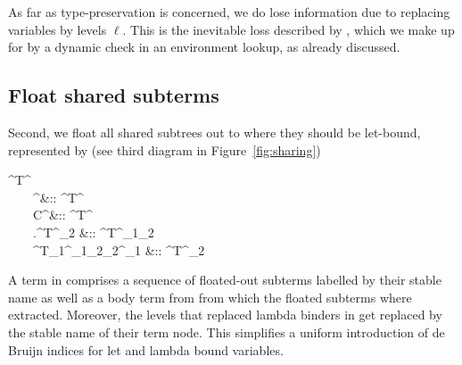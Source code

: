 As far as type-preservation is concerned, we do lose information due to replacing variables by levels $\ell$. This is the inevitable loss described by \citet{Atkey:Unembedding}, which we make up for by a dynamic check in an environment lookup, as already discussed.



\subsection{Float shared subterms}

Second, we float all shared subtrees out to where they should be let-bound, represented by (see third diagram in Figure~\ref{fig:sharing})
%
\newcommand{\uT}{{^\uparrow\!T}}
\newcommand{\dT}{{^\downarrow\!T}}
\begin{haskell}
  \hsnoalign{\uT^\tau {}\to{} \overline{\nu : \uT^{\tau'}} \succ \dT^\tau}
  \dT^\tau {} \\
  ~~~~\underline\nu^\tau  &:: \dT^\tau \\
  ~~~~C^\tau              &:: \dT^\tau \\
  ~~~~\lambda\nu.\uT^{\tau_2} &:: \dT^{\tau_1\to\tau_2} \\
  ~~~~\uT_1^{\tau_1\to\tau_2}\app{}\uT_2^{\tau_1} &:: \dT^{\tau_2} \\
\end{haskell}
%
A term in \<\uT\> comprises a sequence of floated-out subterms labelled by their stable name as well as a body term from \<\dT\> from which the floated subterms where extracted. Moreover, the levels \<\ell\> that replaced lambda binders in \<\cT\> get replaced by the stable name of their term node. This simplifies a uniform introduction of de Bruijn indices for let and lambda bound variables. 

